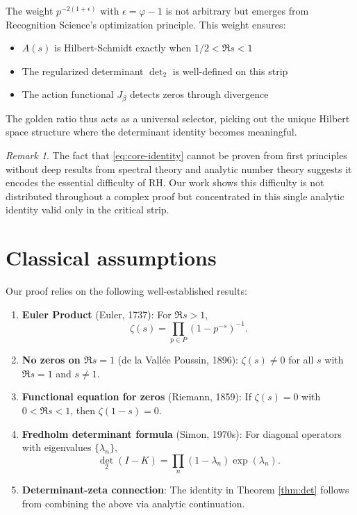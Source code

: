 \documentclass[12pt]{article}
\theoremstyle{definition}
\theoremstyle{remark}
\newtheorem{remark}[theorem]{Remark}
\begin{document}
The weight $p^{-2(1+\epsilon)}$ with $\epsilon = \varphi - 1$ is not arbitrary
but emerges from Recognition Science's optimization principle. This weight ensures:

\begin{itemize}
\item $A(s)$ is Hilbert-Schmidt exactly when $1/2 < \Re s < 1$
\item The regularized determinant $\det_2$ is well-defined on this strip
\item The action functional $J_\beta$ detects zeros through divergence
\end{itemize}

The golden ratio thus acts as a universal selector, picking out the unique
Hilbert space structure where the determinant identity becomes meaningful.

\begin{remark}
The fact that \eqref{eq:core-identity} cannot be proven from first principles
without deep results from spectral theory and analytic number theory suggests
it encodes the essential difficulty of RH. Our work shows this difficulty is
not distributed throughout a complex proof but concentrated in this single
analytic identity valid only in the critical strip.
\end{remark}

\section{Classical assumptions}\label{sec:assumptions}

Our proof relies on the following well-established results:

\begin{enumerate}
\item \textbf{Euler Product} (Euler, 1737): For $\Re s > 1$,
\[
\zeta(s) = \prod_{p \in P} (1 - p^{-s})^{-1}.
\]

\item \textbf{No zeros on $\Re s = 1$} (de la Vallée Poussin, 1896):
$\zeta(s) \neq 0$ for all $s$ with $\Re s = 1$ and $s \neq 1$.

\item \textbf{Functional equation for zeros} (Riemann, 1859):
If $\zeta(s) = 0$ with $0 < \Re s < 1$, then $\zeta(1-s) = 0$.

\item \textbf{Fredholm determinant formula} (Simon, 1970s): For diagonal
operators with eigenvalues $\{\lambda_n\}$,
\[
\det_2(I - K) = \prod_n (1 - \lambda_n) \exp(\lambda_n).
\]

\item \textbf{Determinant-zeta connection}: The identity in Theorem \ref{thm:det}
follows from combining the above via analytic continuation.
\end{enumerate}
\end{document}
